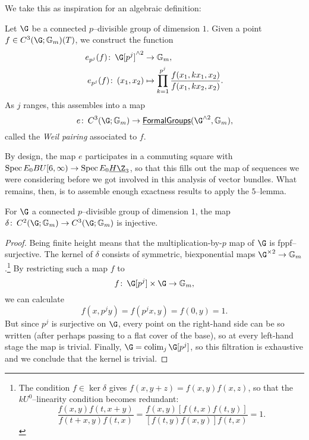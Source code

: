 We take this as inspiration for an algebraic definition:

\begin{definition}
Let $\G$ be a connected $p$--divisible group of dimension $1$.  Given a point $f \in C^3(\G; \Gm)(T)$, we construct the function
\begin{align*}
e_{p^j}(f)\co \G[p^j]^{\sm 2} & \to \Gm, \\
e_{p^j}(f)\co (x_1, x_2) & \mapsto \prod_{k=1}^{p^j} \frac{f(x_1, kx_1, x_2)}{f(x_1, kx_2, x_2)}.
\end{align*}
As $j$ ranges, this assembles into a map \[e\co C^3(\G; \Gm) \to \InternalHom{FormalGroups}(\G^{\sm 2}, \Gm),\] called the \textit{Weil pairing} associated to $f$.
\end{definition}

By design, the map $e$ participates in a commuting square with $\Spec E_0 BU[6, \infty) \to \Spec E_0 \OS{H\Z}{3}$, so that this fills out the map of sequences we were considering before we got involved in this analysis of vector bundles.  What remains, then, is to assemble enough exactness results to apply the $5$--lemma.

\begin{lemma}
For $\G$ a connected $p$--divisible group of dimension $1$, the map $\delta\co C^2(\G; \Gm) \to C^3(\G; \Gm)$ is injective.
\end{lemma}
\begin{proof}
Being finite height means that the multiplication-by-$p$ map of $\G$ is fppf--surjective.  The kernel of $\delta$ consists of symmetric, biexponential maps $\G^{\times 2} \to \Gm$.\footnote{The condition $f \in \ker \delta$ gives $f(x, y+z) = f(x, y)f(x, z)$, so that the $kU^0$--linearity condition becomes redundant: \[\frac{f(x, y) f(t, x+y)}{f(t+x, y) f(t, x)} = \frac{f(x, y) [f(t, x) f(t, y)]}{[f(t, y) f(x, y)] f(t, x)} = 1.\]}  By restricting such a map $f$ to \[f \co \G[p^j] \times \G \to \Gm,\] we can calculate \[f(x, p^j y) = f(p^j x, y) = f(0, y) = 1.\]  But since $p^j$ is surjective on $\G$, every point on the right-hand side can be so written (after perhaps passing to a flat cover of the base), so at every left-hand stage the map is trivial.  Finally, $\G = \colim_j \G[p^j]$, so this filtration is exhaustive and we conclude that the kernel is trivial.
\end{proof}

